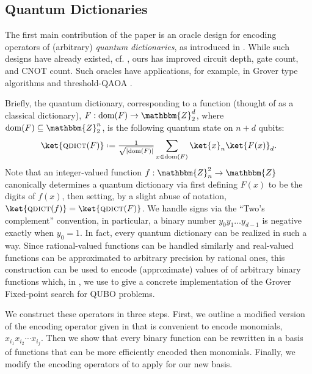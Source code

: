 \documentclass[reqno,oneside,12pt]{amsart}  %
\numberwithin{equation}{section}                %
\let\originalleft\left
\let\originalright\right
\renewcommand{\left}{\mathopen{}\mathclose\bgroup\originalleft}
\renewcommand{\right}{\aftergroup\egroup\originalright}
\def\({\mathopen{}\left(}
\def\){\right)\mathclose{}}
\newcommand*{\eqdef}{\mathrel{\vcenter{\baselineskip0.5ex \lineskiplimit0pt\hbox{.}\hbox{.}}}=}
\def\Z{\mathbbm{Z}}
\def\dom{\mathrm{dom}}
\def\qdict{\textsc{qdict}}
\begin{document}
\medskip

\subsection{Quantum Dictionaries}
\label{sec:qdicts}

The first main contribution of the paper is an oracle design for encoding operators of (arbitrary) \emph{quantum dictionaries}, as introduced in \cite{gilliam_foundational_2021}. While such designs have already existed, cf. \cite{gilliam_grover_2021}, ours has improved circuit depth, gate count, and CNOT count. Such oracles have applications, for example, in Grover type algorithms and threshold-QAOA \cite{golden_threshold_2021}.

Briefly, the quantum dictionary, corresponding to a function (thought of as a classical dictionary), $F: \dom \( F \) \rightarrow \Z_2^d$, where $\dom \( F \) \subseteq \Z_2^n$, is the following quantum state on $n + d$ qubits:
\begin{equation}
   \ket{\qdict \( F \)} \eqdef \tfrac{1}{\sqrt{\left| \dom \( F \) \right|}} \sum\limits_{x \in \dom \( F \)} \ket{x}_n \ket{F (x)}_d.
\end{equation}
Note that an integer-valued function $f : \Z_n^2 \rightarrow \Z$ canonically determines a quantum dictionary via first defining $F (x)$ to be the digits of $f (x)$, then setting, by a slight abuse of notation, $\ket{\qdict \( f \)} = \ket{\qdict \( F \)}$. We handle signs via the ``Two's complement'' convention, in particular, a binary number $y_0 y_1 \ldots y_{d - 1}$ is negative exactly when $y_0 = 1$. In fact, every quantum dictionary can be realized in such a way. Since rational-valued functions can be handled similarly and real-valued functions can be approximated to arbitrary precision by rational ones, this construction can be used to encode (approximate) values of of arbitrary binary functions which, in , we use to give a concrete implementation of the Grover Fixed-point search for QUBO problems.

We construct these operators in three steps. First, we outline a modified version of the encoding operator given in \cite{gilliam_grover_2021} that is convenient to encode monomials, $x_{i_1} x_{i_2} \cdots x_{i_j}$. Then we show that every binary function can be rewritten in a basis of functions that can be more efficiently encoded then monomials. Finally, we modify the encoding operators of \cite{gilliam_grover_2021} to apply for our new basis.
\end{document}
